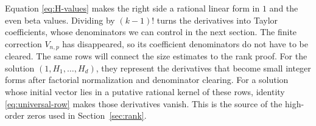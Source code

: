 Equation \eqref{eq:H-values} makes the right side a rational linear form
in $1$ and the even beta values. Dividing by $(k-1)!$ turns the derivatives
into Taylor coefficients, whose denominators we can control in the next
section. The finite correction $V_{n,p}$ has disappeared, so its
coefficient denominators do not have to be cleared.
The same rows will connect the size estimates to the rank proof.
For the solution $(1,H_1,\ldots,H_d)$, they represent the derivatives
that become small integer forms after factorial normalization and
denominator clearing. For a solution whose initial vector lies in a
putative rational kernel of these rows, identity
\eqref{eq:universal-row} makes those derivatives vanish. This is the
source of the high-order zeros used in Section~\ref{sec:rank}.

